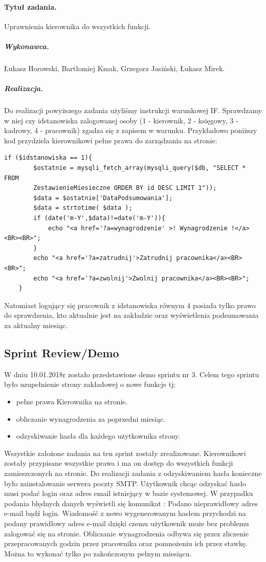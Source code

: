 \documentclass[a4paper]{article}
\begin{document}
\paragraph{Tytuł zadania.} Uprawnienia kierownika do wszystkich funkcji.
\subparagraph{Wykonawca.} Łukasz Horowski, Bartłomiej Kmak, Grzegorz Jasiński, Łukasz Mirek.
\subparagraph{Realizacja.}  Do realizacji powyższego zadania użyliśmy instrukcji warunkowej IF. Sprawdzamy w niej czy idstanowiska zalogowanej osoby (1 - kierownik, 2 - księgowy, 3 - kadrowy, 4 - pracownik) zgadza się z zapisem w warunku. Przykładowo poniższy kod przydziela kierownikowi pełne prawa do zarządzania na stronie: 
\begin{verbatim}
if ($idstanowiska == 1){
		$ostatnie = mysqli_fetch_array(mysqli_query($db, "SELECT * FROM
		ZestawienieMiesieczne ORDER BY id DESC LIMIT 1"));
		$data = $ostatnie['DataPodsumowania'];
		$data = strtotime( $data );
		if (date('m-Y',$data)!=date('m-Y')){		
			echo "<a href='?a=wynagrodzenie' >! Wynagrodzenie !</a><BR><BR>";
		}
		echo "<a href='?a=zatrudnij'>Zatrudnij pracownika</a><BR><BR>";
		echo "<a href='?a=zwolnij'>Zwolnij pracownika</a><BR><BR>";
	}
\end{verbatim}
Natomiast logujący się pracownik z idstanowiska równym 4 posiada tylko prawo do sprawdzenia, kto aktualnie jest na zakładzie oraz wyświetlenia podsumowania za aktualny miesiąc. 


\subsection{Sprint Review/Demo}
W dniu 10.01.2018r zostało przedstawione demo sprintu nr 3. Celem tego sprintu było uzupełnienie strony zakładowej o nowe funkcje tj:
\begin{itemize}
\item pełne prawa Kierownika na stronie.
\item obliczanie wynagrodzenia za poprzedni miesiąc.
\item odzyskiwanie hasła dla każdego użytkownika strony.
\end{itemize}
Wszystkie założone zadania na ten sprint zostały zrealizowane. Kierownikowi zostały przypisane wszystkie prawa i ma on dostęp do wszystkich funkcji zamieszczonych na stronie.
Do realizacji zadania z odzyskiwaniem hasła konieczne było zainstalowanie serwera poczty SMTP. Użytkownik chcąc odzyskać hasło musi podać login oraz adres email istniejący w bazie systemowej. W przypadku podania błędnych danych wyświetli się komunikat : Podano nieprawidłowy adres e-mail bądź login. Wiadomość z nowo wygenerowanym hasłem przychodzi na podany prawidłowy adres e-mail dzięki czemu użytkownik może bez problemu zalogować się na stronie.
Obliczanie wynagrodzenia odbywa się przez zliczenie przepracowanych godzin przez pracownika oraz pomnożeniu ich przez stawkę. Można to wykonać tylko po zakończonym pełnym miesiącu.
\end{document}
